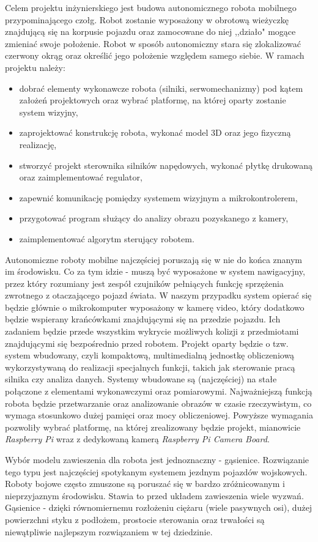 Celem projektu inżynierskiego jest budowa autonomicznego robota mobilnego przypominającego czołg. Robot zostanie wyposażony w obrotową wieżyczkę znajdującą się na korpusie pojazdu oraz zamocowane do niej ,,działo" mogące zmieniać swoje położenie. Robot w sposób autonomiczny stara się zlokalizować czerwony okrąg oraz określić jego położenie względem samego siebie. W ramach projektu należy:
\begin{itemize}
\item dobrać elementy wykonawcze robota (silniki, serwomechanizmy) pod kątem założeń projektowych oraz wybrać platformę, na której oparty zostanie system wizyjny,
\item zaprojektować konstrukcję robota, wykonać model 3D oraz jego fizyczną realizację,
\item stworzyć projekt sterownika silników napędowych, wykonać płytkę drukowaną oraz zaimplementować regulator,
\item zapewnić komunikację pomiędzy systemem wizyjnym a mikrokontrolerem,
\item przygotować program służący do analizy obrazu pozyskanego z kamery,
\item zaimplementować algorytm sterujący robotem.
\end{itemize}

Autonomiczne roboty mobilne najczęściej poruszają się w nie do końca znanym im środowisku. Co za tym idzie - muszą być wyposażone w system nawigacyjny, przez który rozumiany jest zespół czujników pełniących funkcję sprzężenia zwrotnego z otaczającego pojazd świata. W naszym przypadku system opierać się będzie głównie o mikrokomputer wyposażony w kamerę video, który dodatkowo będzie wspierany krańcówkami znajdującymi się na przedzie pojazdu. Ich zadaniem będzie przede wszystkim wykrycie możliwych kolizji z przedmiotami znajdującymi się bezpośrednio przed robotem. Projekt oparty będzie o tzw. system wbudowany, czyli kompaktową, multimedialną jednostkę obliczeniową wykorzystywaną do realizacji specjalnych funkcji, takich jak sterowanie pracą silnika czy analiza danych. Systemy wbudowane są (najczęściej) na stałe połączone z elementami wykonawczymi oraz pomiarowymi. Najważniejszą funkcją robota będzie przetwarzanie oraz analizowanie obrazów w czasie rzeczywistym, co wymaga stosunkowo dużej pamięci oraz mocy obliczeniowej. Powyższe wymagania pozwoliły wybrać platformę, na której zrealizowany będzie projekt, mianowicie \textit{Raspberry Pi} wraz z dedykowaną kamerą \textit{Raspberry Pi Camera Board}. 

Wybór modelu zawieszenia dla robota jest jednoznaczny - gąsienice. Rozwiązanie tego typu jest najczęściej spotykanym systemem jezdnym pojazdów wojskowych. Roboty bojowe często zmuszone są poruszać się w bardzo zróżnicowanym i nieprzyjaznym środowisku. Stawia to przed układem zawieszenia wiele wyzwań.  Gąsienice - dzięki równomiernemu rozłożeniu ciężaru (wiele pasywnych osi), dużej powierzchni styku z podłożem, prostocie sterowania oraz trwałości są niewątpliwie najlepszym rozwiązaniem w tej dziedzinie.
